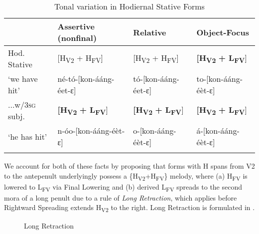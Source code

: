 \documentclass[output=paper
,newtxmath
,modfonts
,nonflat]{langsci/langscibook}
\begin{document}
\begin{table}
\begin{tabularx}{\textwidth}{p{}lll} 
\lsptoprule
&  Assertive (nonfinal) &  Relative &  Object-Focus\\
\midrule
Hod. Stative & [H\textsubscript{V2} + H\textsubscript{FV}] & [H\textsubscript{V2} + H\textsubscript{FV}] & \textbf{[H\textsubscript{V2}} \textbf{+ L\textsubscript{FV}}]\\
‘we have hit’ &
\small né-tó-[kon-ááng-éet-ɛ] &
\small tó-[kon-ááng-éet-ɛ] &
\small to-[kon-ááng-éèt-ɛ]\\
...w/\textsc{3sg} subj. & \textbf{[H\textsubscript{V2}} \textbf{+ L\textsubscript{FV}}] & \textbf{[H\textsubscript{V2}} \textbf{+ L\textsubscript{FV}}] & \textbf{[H\textsubscript{V2}} \textbf{+ L\textsubscript{FV}}]\\
‘he has hit’ &
\small n-óo-[kon-ááng-éèt-ɛ] &
\small o-[kon-ááng-éèt-ɛ] &
\small á-[kon-ááng-éèt-ɛ]\\
\lspbottomrule
\end{tabularx}
\caption{Tonal variation in Hodiernal Stative Forms}
\label{tab:jones:4}
\end{table}
\label{bkm:Ref359194506}

We account for both of these facts by proposing that forms with H spans from V2 to the antepenult underlyingly possess a \{H\textsubscript{V2}+H\textsubscript{FV}\} melody, where (a) H\textsubscript{FV} is lowered to L\textsubscript{FV} via Final Lowering  and (b) derived L\textsubscript{FV} spreads to the second mora of a long penult due to a rule of \textit{Long Retraction}, which applies before Rightward Spreading extends H\textsubscript{V2} to the right. Long Retraction is formulated in .

  
 
\begin{figure}
\caption{Long Retraction}
\label{fig:jones:1}	
\end{figure}
\end{document}
